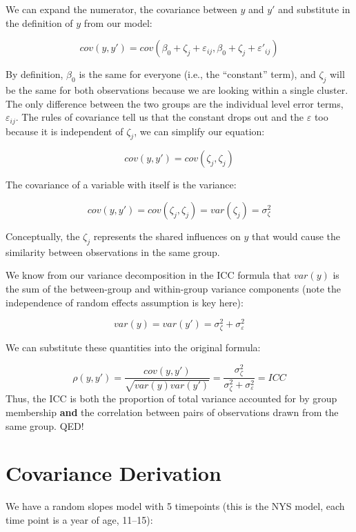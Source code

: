 \documentclass[
  letterpaper,
  DIV=11,
  numbers=noendperiod]{scrreprt}
\begin{document}
We can expand the numerator, the covariance between \(y\) and \(y'\) and
substitute in the definition of \(y\) from our model:

\[
cov(y,y') = cov(\beta_0 + \zeta_j + \varepsilon_{ij}, \beta_0 + \zeta_j + \varepsilon'_{ij})
\]

By definition, \(\beta_0\) is the same for everyone (i.e., the
``constant'' term), and \(\zeta_j\) will be the same for both
observations because we are looking within a single cluster. The only
difference between the two groups are the individual level error terms,
\(\varepsilon_{ij}\). The rules of covariance tell us that the constant
drops out and the \(\varepsilon\) too because it is independent of
\(\zeta_j\), we can simplify our equation:

\[
cov(y,y') = cov(\zeta_j, \zeta_j) 
\]

The covariance of a variable with itself is the variance:

\[
cov(y,y') = cov(\zeta_j, \zeta_j) = var(\zeta_j) = \sigma^2_\zeta
\]

Conceptually, the \(\zeta_j\) represents the shared influences on \(y\)
that would cause the similarity between observations in the same group.

We know from our variance decomposition in the ICC formula that
\(var(y)\) is the sum of the between-group and within-group variance
components (note the independence of random effects assumption is key
here):

\[
var(y) = var(y') = \sigma^2_\zeta + \sigma^2_\varepsilon
\]

We can substitute these quantities into the original formula:

\[
\rho(y, y') = \frac{cov(y,y')}{\sqrt{var(y)var(y')}} = \frac{\sigma^2_\zeta}{\sigma^2_\zeta + \sigma^2_\varepsilon} = ICC
\] Thus, the ICC is both the proportion of total variance accounted for
by group membership \textbf{and} the correlation between pairs of
observations drawn from the same group. QED!

\hypertarget{covariance-derivation}{%
\chapter{Covariance Derivation}\label{covariance-derivation}}

We have a random slopes model with 5 timepoints (this is the NYS model,
each time point is a year of age, 11--15):
\end{document}

